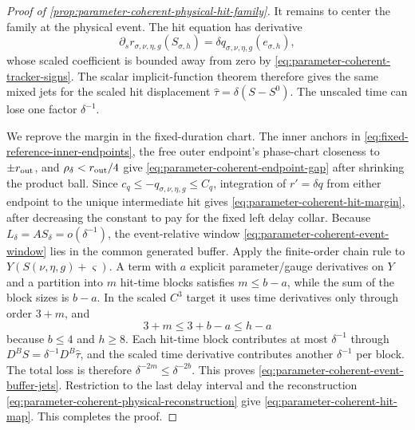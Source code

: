 \begin{proof}[Proof of
\cref{prop:parameter-coherent-physical-hit-family}]
It remains to center the family at the physical event.  The hit equation
has derivative
\[
 \partial_s r_{\sigma,\nu,\eta,g}(S_{\sigma,h})
 =\delta q_{\sigma,\nu,\eta,g}(e_{\sigma,h}),
\]
whose scaled coefficient is bounded away from zero by
\cref{eq:parameter-coherent-tracker-signs}.  The scalar implicit-function
theorem therefore gives the same mixed jets for the scaled hit displacement
$\widehat\tau=\delta(S-S^0)$.  The unscaled time can lose one factor
\(\delta^{-1}\).

We reprove the margin in the fixed-duration chart.  The inner anchors in
\cref{eq:fixed-reference-inner-endpoints}, the free outer endpoint's
phase-chart closeness to $\pm r_{\rm out}$, and
$\rho_\delta<r_{\rm out}/4$ give
\cref{eq:parameter-coherent-endpoint-gap} after shrinking the product
ball.  Since
$c_q\le-q_{\sigma,\nu,\eta,g}\le C_q$, integration of
$r'=\delta q$ from either endpoint to the unique intermediate hit gives
\cref{eq:parameter-coherent-hit-margin}, after decreasing the constant to
pay for the fixed left delay collar.  Because
$L_\delta=AS_\delta=o(\delta^{-1})$, the event-relative window
\cref{eq:parameter-coherent-event-window} lies in the common generated
buffer.  Apply the finite-order chain rule to
$Y(S(\nu,\eta,g)+\varsigma)$.  A term with $a$ explicit parameter/gauge
derivatives on $Y$ and a partition into $m$ hit-time blocks satisfies
$m\le b-a$, while the sum of the block sizes is $b-a$.  In the scaled
$C^3$ target it uses time derivatives only through order $3+m$, and
\[
 3+m\le3+b-a\le h-a
\]
because $b\le4$ and $h\ge8$.  Each hit-time block contributes at most
$\delta^{-1}$ through $D^B S=\delta^{-1}D^B\widehat\tau$, and the scaled
time derivative contributes another $\delta^{-1}$ per block.  The total
loss is therefore $\delta^{-2m}\le\delta^{-2b}$.  This proves
\cref{eq:parameter-coherent-event-buffer-jets}.  Restriction to the last
delay interval and the reconstruction
\cref{eq:parameter-coherent-physical-reconstruction} give
\cref{eq:parameter-coherent-hit-map}.  This completes the proof.
\end{proof}

